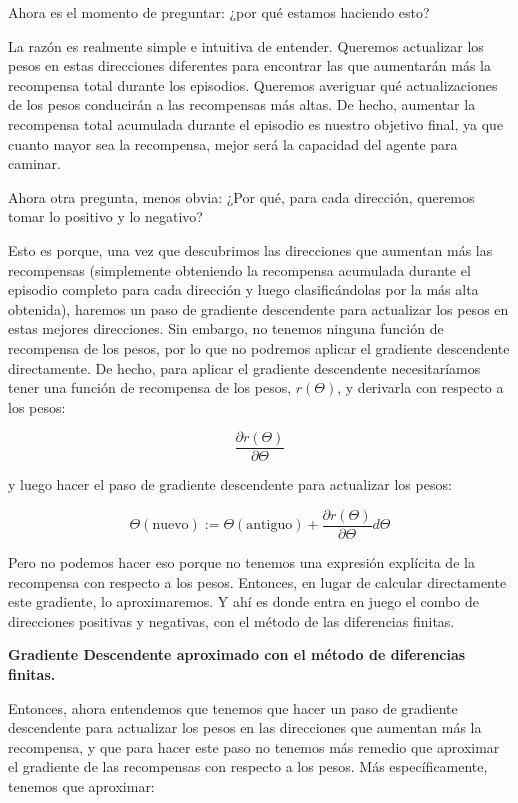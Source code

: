 \documentclass[
]{book}
\begin{document}
Ahora es el momento de preguntar: ¿por qué estamos haciendo esto?

La razón es realmente simple e intuitiva de entender. Queremos actualizar los pesos en estas direcciones diferentes para encontrar las que aumentarán más la recompensa total durante los episodios. Queremos averiguar qué actualizaciones de los pesos conducirán a las recompensas más altas. De hecho, aumentar la recompensa total acumulada durante el episodio es nuestro objetivo final, ya que cuanto mayor sea la recompensa, mejor será la capacidad del agente para caminar.

Ahora otra pregunta, menos obvia: ¿Por qué, para cada dirección, queremos tomar lo positivo y lo negativo?

Esto es porque, una vez que descubrimos las direcciones que aumentan más las recompensas (simplemente obteniendo la recompensa acumulada durante el episodio completo para cada dirección y luego clasificándolas por la más alta obtenida), haremos un paso de gradiente descendente para actualizar los pesos en estas mejores direcciones. Sin embargo, no tenemos ninguna función de recompensa de los pesos, por lo que no podremos aplicar el gradiente descendente directamente. De hecho, para aplicar el gradiente descendente necesitaríamos tener una función de recompensa de los pesos, \(r(\Theta)\), y derivarla con respecto a los pesos:

\[\frac{\partial r(\Theta)}{\partial \Theta}\]

y luego hacer el paso de gradiente descendente para actualizar los pesos:

\[\Theta(\textrm{nuevo}) := \Theta(\textrm{antiguo}) + \frac{\partial r(\Theta)}{\partial \Theta} d \Theta\]

Pero no podemos hacer eso porque no tenemos una expresión explícita de la recompensa con respecto a los pesos. Entonces, en lugar de calcular directamente este gradiente, lo aproximaremos. Y ahí es donde entra en juego el combo de direcciones positivas y negativas, con el método de las diferencias finitas.

\textbf{Gradiente Descendente aproximado con el método de diferencias finitas.}

Entonces, ahora entendemos que tenemos que hacer un paso de gradiente descendente para actualizar los pesos en las direcciones que aumentan más la recompensa, y que para hacer este paso no tenemos más remedio que aproximar el gradiente de las recompensas con respecto a los pesos. Más específicamente, tenemos que aproximar:
\end{document}
